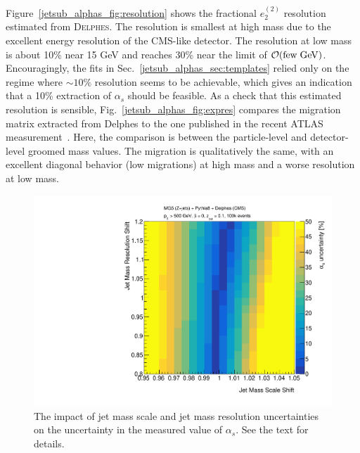 \documentclass[11pt]{cernrep}
\begin{document}
Figure~\ref{jetsub_alphas_fig:resolution} shows the fractional $e_2^{(2)}$ resolution estimated from \textsc{Delphes}.
%
The resolution is smallest at high mass due to the excellent energy resolution of the CMS-like detector.
%
The resolution at low mass is about 10\% near 15 GeV and reaches 30\% near the limit of $\mathcal{O}(\mathrm{few\hspace{1mm}GeV})$.
%
Encouragingly, the fits in Sec.~\ref{jetsub_alphas_sec:templates} relied only on the regime where $\sim 10\%$ resolution seems to be achievable, which gives an indication that a 10\% extraction of $\alpha_s$ should be feasible.
%
As a check that this estimated resolution is sensible, Fig.~\ref{jetsub_alphas_fig:expres} compares the migration matrix extracted from Delphes to the one published in the recent ATLAS measurement~\cite{Aaboud:2017qwh}.
%
Here, the comparison is between the particle-level and detector-level groomed mass values. 
%
The migration is qualitatively the same, with an excellent diagonal behavior (low migrations) at high mass and a worse resolution at low mass.

\begin{figure}[t]
\begin{center}
\includegraphics[width = 0.5\columnwidth]{jetsub_alphas_resolution_scan.pdf}
\end{center}
\caption{The impact of jet mass scale and jet mass resolution uncertainties on the uncertainty in the measured value of $\alpha_s$.  See the text for details.}
\label{jetsub_alphas_fig:expfit}
\end{figure}
\end{document}
